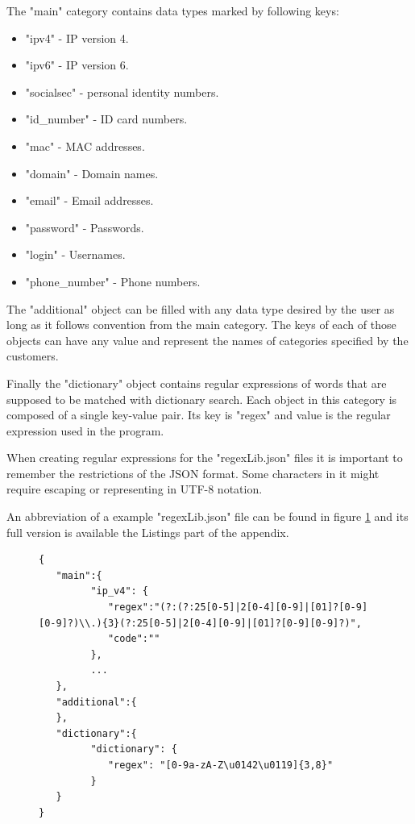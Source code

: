 \documentclass[a4paper,twoside,12pt]{book}
\begin{document}
The "main" category contains data types marked by following keys:

\begin{itemize}
   \item "ipv4" - IP version 4.
   \item "ipv6" - IP version 6.
   \item "socialsec" - personal identity numbers.
   \item "id\_number" - ID card numbers.
   \item "mac" - MAC addresses.
   \item "domain" - Domain names.
   \item "email" - Email addresses.
   \item "password" - Passwords.
   \item "login" - Usernames.
   \item "phone\_number" - Phone numbers.
\end{itemize} 

The "additional" object can be filled with any data type desired by the user as long 
as it follows convention from the main category. The keys of each of those objects can have any value and represent the names of categories
specified by the customers.

Finally the "dictionary" object contains regular expressions of words that are supposed to be matched with dictionary search. Each object in this category 
is composed of a single key-value pair. Its key is "regex" and value is the regular expression used in the program. 

When creating regular expressions for the "regexLib.json" files it is important to remember the restrictions of the 
JSON format. Some characters in it might require escaping or representing in UTF-8 notation.

An abbreviation of a example "regexLib.json" file can be found in figure \ref{fig:regexLibSimple} and its full version is available the Listings part of the appendix.

\begin{figure}
\centering
\begin{lstlisting}
{
   "main":{
         "ip_v4": {
            "regex":"(?:(?:25[0-5]|2[0-4][0-9]|[01]?[0-9][0-9]?)\\.){3}(?:25[0-5]|2[0-4][0-9]|[01]?[0-9][0-9]?)",
            "code":""
         },
         ...
   },
   "additional":{
   },
   "dictionary":{
         "dictionary": {
            "regex": "[0-9a-zA-Z\u0142\u0119]{3,8}"
         }
   }
}
\end{lstlisting}
\caption{}
\label{fig:regexLibSimple}
\end{figure}
\end{document}
